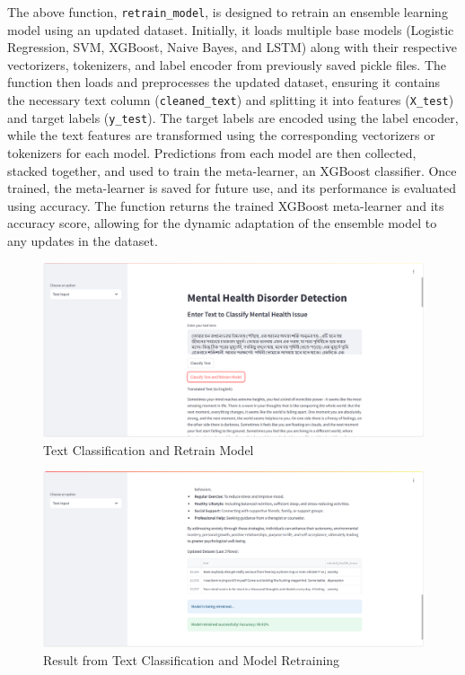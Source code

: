 \noindent
The above function, \texttt{retrain\_model}, is designed to retrain an ensemble learning model using an updated dataset. Initially, it loads multiple base models (Logistic Regression, SVM, XGBoost, Naive Bayes, and LSTM) along with their respective vectorizers, tokenizers, and label encoder from previously saved pickle files. The function then loads and preprocesses the updated dataset, ensuring it contains the necessary text column (\texttt{cleaned\_text}) and splitting it into features (\texttt{X\_test}) and target labels (\texttt{y\_test}). The target labels are encoded using the label encoder, while the text features are transformed using the corresponding vectorizers or tokenizers for each model. Predictions from each model are then collected, stacked together, and used to train the meta-learner, an XGBoost classifier. Once trained, the meta-learner is saved for future use, and its performance is evaluated using accuracy. The function returns the trained XGBoost meta-learner and its accuracy score, allowing for the dynamic adaptation of the ensemble model to any updates in the dataset.








\pagebreak

\begin{figure}[h!]  
    \centering
    \includegraphics[width=1.0\textwidth]{App Images/14 Interface.png}  
    \caption{Text Classification and Retrain Model}
    \label{101i}  %
\end{figure}

\begin{figure}[h!]  
    \centering
    \includegraphics[width=1.0\textwidth]{App Images/15 Interface.png}  
    \caption{Result from Text Classification and Model Retraining}
    \label{102i}  %
\end{figure}

